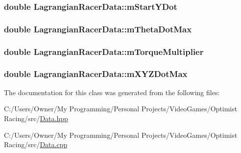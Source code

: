 \hypertarget{class_lagrangian_racer_data_a6a7c78ce9de7ffcbb33be68528e5517d}{
\subsubsection[{m\-Start\-Y\-Dot}]{\setlength{\rightskip}{0pt plus 5cm}double Lagrangian\-Racer\-Data\-::m\-Start\-Y\-Dot}}\label{class_lagrangian_racer_data_a6a7c78ce9de7ffcbb33be68528e5517d}
\hypertarget{class_lagrangian_racer_data_a675af79a245f4b87be42c231fc2a0cb4}{
\subsubsection[{m\-Theta\-Dot\-Max}]{\setlength{\rightskip}{0pt plus 5cm}double Lagrangian\-Racer\-Data\-::m\-Theta\-Dot\-Max}}\label{class_lagrangian_racer_data_a675af79a245f4b87be42c231fc2a0cb4}
\hypertarget{class_lagrangian_racer_data_ad8276c8d2a904ed4eeda7590cc12cf25}{
\subsubsection[{m\-Torque\-Multiplier}]{\setlength{\rightskip}{0pt plus 5cm}double Lagrangian\-Racer\-Data\-::m\-Torque\-Multiplier}}\label{class_lagrangian_racer_data_ad8276c8d2a904ed4eeda7590cc12cf25}
\hypertarget{class_lagrangian_racer_data_a1ae8b9a4774c97eada607bea3588e12c}{
\subsubsection[{m\-X\-Y\-Z\-Dot\-Max}]{\setlength{\rightskip}{0pt plus 5cm}double Lagrangian\-Racer\-Data\-::m\-X\-Y\-Z\-Dot\-Max}}\label{class_lagrangian_racer_data_a1ae8b9a4774c97eada607bea3588e12c}


The documentation for this class was generated from the following files\-:\begin{DoxyCompactItemize}
\item 
C\-:/\-Users/\-Owner/\-My Programming/\-Personal Projects/\-Video\-Games/\-Optimist Racing/src/\hyperlink{_data_8hpp}{Data.\-hpp}\item 
C\-:/\-Users/\-Owner/\-My Programming/\-Personal Projects/\-Video\-Games/\-Optimist Racing/src/\hyperlink{_data_8cpp}{Data.\-cpp}\end{DoxyCompactItemize}
